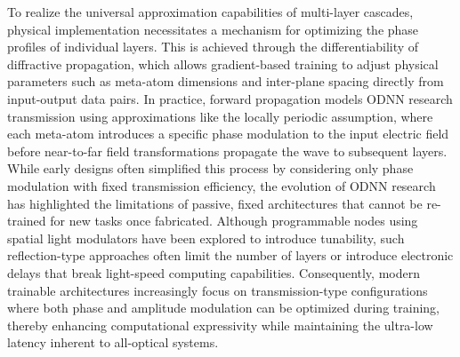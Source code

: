 \documentclass[11pt]{article}
\begin{document}
To realize the universal approximation capabilities of multi-layer cascades, physical implementation necessitates a mechanism for optimizing the phase profiles of individual layers. This is achieved through the differentiability of diffractive propagation, which allows gradient-based training to adjust physical parameters such as meta-atom dimensions and inter-plane spacing directly from input-output data pairs. \citep{doi_10_1117_12_2661856_e8f727e8} \citep{doi_10_1002_mop_70313_0297d592} In practice, forward propagation models ODNN research transmission using approximations like the locally periodic assumption, where each meta-atom introduces a specific phase modulation to the input electric field before near-to-far field transformations propagate the wave to subsequent layers. While early designs often simplified this process by considering only phase modulation with fixed transmission efficiency, the evolution of ODNN research has highlighted the limitations of passive, fixed architectures that cannot be re-trained for new tasks once fabricated. Although programmable nodes using spatial light modulators have been explored to introduce tunability, such reflection-type approaches often limit the number of layers or introduce electronic delays that break light-speed computing capabilities. Consequently, modern trainable architectures increasingly focus on transmission-type configurations where both phase and amplitude modulation can be optimized during training, thereby enhancing computational expressivity while maintaining the ultra-low latency inherent to all-optical systems. \citep{doi_10_1038_s41598_022_19973_0_e156e6e2} \citep{doi_10_1038_s41928_022_00719_9_a2169947}
\end{document}
